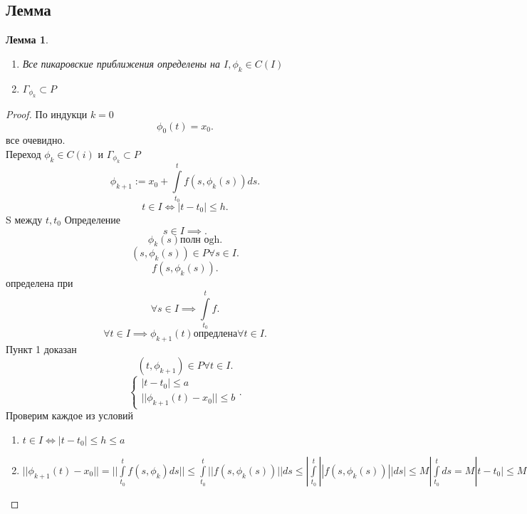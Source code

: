 \documentclass[14pt]{extarticle}
\newtheorem{lemma}[theorem]{Лемма}
\begin{document}
      \subsection{Лемма}
      \begin{lemma}
          \begin{enumerate}
              \item Все пикаровские приближения определены на $I, \phi_{k} \in C(I)$
              \item $\Gamma_{\phi_{k}} \subset P$
          \end{enumerate}
      \end{lemma}
      \begin{proof}
          По индукци $k = 0$
           \[
          \phi_{0}(t) = x_0
          .\] 
          все очевидно.\\
          Переход $\phi_{k} \in C(i) $ и $\Gamma_{\phi_{k}} \subset P$
          \[
          \phi_{k + 1} := x_0 + \int\limits_{t_0}^{t}f(s,\phi_{k}(s)) ds
          .\] 
          \[
          t \in I \iff |t-t_0|\le h
          .\] 
          S между  $t,t_0$
        Определение  \[
          s \in I \implies
          .\] 
          \[
              \phi_{k}(s) \text{полн оgh}
          .\] 
          \[
              (s,\phi_{k}(s)) \in P \forall  s\in I
          .\] 
          \[
          f(s,\phi_{k}(s))
          .\] 
          определена при 
          \[
          \forall  s \in I \implies \int\limits_{t_0}^{t} f 
          .\] 
          \[
              \forall  t \in I \implies \phi_{k +1}(t) \text{опредлена} \forall t\in I
          .\] 
          Пункт 1 доказан
          \[
              (t,\phi_{k+1}) \in P \forall  t \in I
          .\] 
          \[
          \begin{cases}
              |t - t_0| \le  a\\
              ||\phi_{k + 1} (t) - x_0|| \le  b
          \end{cases}
          .\] 
          Проверим каждое из условий
          \begin{enumerate}
              \item 
                  $t \in I \iff |t-t_0|\le h \le a$ 
              \item $||\phi_{k+1}(t) - x_0|| = || \int\limits_{t_0}^{t} f(s,\phi_{k}) ds||\le  \int\limits_{t_0}^{t} ||f(s,\phi_{k}(s))||ds \le |\int\limits_{t_0}^{t} ||f(s,\phi_{k}(s))||ds| \le  M | \int\limits_{t_0}^{t} ds = M|t-t_0|\le  Mh = b $
         \end{enumerate}
      \end{proof}
\end{document}
